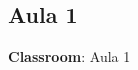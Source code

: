 \documentclass{article}
\begin{document}


\tableofcontents
\clearpage  %

\setcounter{page}{1}


\subsection{Aula 1}
\vspace*{.1cm}

\begin{flushright}
{\LARGE \textbf{Classroom}: Aula 1}
\end{flushright}
\vspace{1cm}
\end{document}
